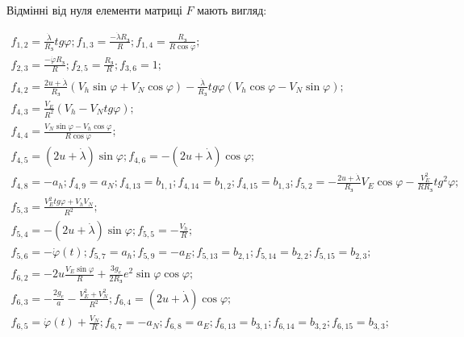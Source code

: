 Відмінні від нуля елементи матриці $F$ мають вигляд:

\begin{equation} 
\begin{array}{l}
\label{eq:Fsdins_} 
{f_{1,2} =\frac{\dot{\lambda }}{R_{\text{З}} } tg\varphi;f_{1,3} =\frac{-\dot{\lambda }R_{\text{З}} }{R};f_{1,4} =\frac{R_{\text{З}} }{R\cos \varphi } ;}\\
{f_{2,3} =\frac{-\dot{\varphi }R_{\text{З}} }{R};f_{2,5} =\frac{R_{\text{З}} }{R};f_{3,6} =1;}\\
{f_{4,2} =\frac{2u+\dot{\lambda }}{R_{\text{З}} } \left(V_{h} \sin \varphi +V_{N} \cos \varphi \right)-\frac{\dot{\lambda }}{R_{\text{З}} } tg\varphi \left(V_{h} \cos \varphi -V_{N} \sin \varphi \right);}\\
{f_{4,3}=\frac{V_{E} }{R^{2} } \left(V_{h} -V_{N} tg\varphi \right);}\\
{f_{4,4}=\frac{V_{N}\sin \varphi -V_{h} \cos \varphi }{R\cos \varphi } ;}\\
{f_{4,5}=\left(2u+\dot{\lambda }\right)\sin \varphi; f_{4,6}=-\left(2u+\dot{\lambda }\right)\cos \varphi ;}\\
{f_{4,8}=-a_{h};f_{4,9}=a_{N};f_{4,13}=b_{1,1};f_{4,14}=b_{1,2};f_{4,15}=b_{1,3};}
{f_{5,2}=-\frac{2u+\dot{\lambda }}{R_{\text{З}} }V_{E} \cos \varphi -\frac{V_{E}^{2} }{RR_{\text{З}} } tg^{2} \varphi ;}\\
{f_{5,3}=\frac{V_{E}^{2} tg\varphi +V_{h} V_{N} }{R^{2} } ;}\\ 
{f_{5,4}=-\left(2u+\dot{\lambda }\right)\sin \varphi;f_{5,5}=-\frac{V_{h} }{R};}\\
{f_{5,6}=-\dot{\varphi }(t);f_{5,7}=a_{h}; f_{5,9} =-a_{E};f_{5,13}=b_{2,1};f_{5,14}=b_{2,2};f_{5,15}=b_{2,3} ;}\\
{f_{6,2} =-2u\frac{V_{E}^{} \sin \varphi }{R} +\frac{3g_{e} }{2R_{\text{З}}} e^{2} \sin \varphi \cos \varphi ;}\\
{f_{6,3} =-\frac{2g_{e} }{a} -\frac{V_{E}^{2} +V_{N}^{2}}{R^{2} };f_{6,4} =\left(2u+\dot{\lambda }\right)\cos \varphi ;}\\
{f_{6,5}=\dot{\varphi }(t)+\frac{V_{N} }{R};f_{6,7} =-a_{N} ;f_{6,8} =a_{E} ;f_{6,13}=b_{3,1};f_{6,14}=b_{3,2}; f_{6,15}=b_{3,3} ;}\\ 

\end{array}
\end{equation}
